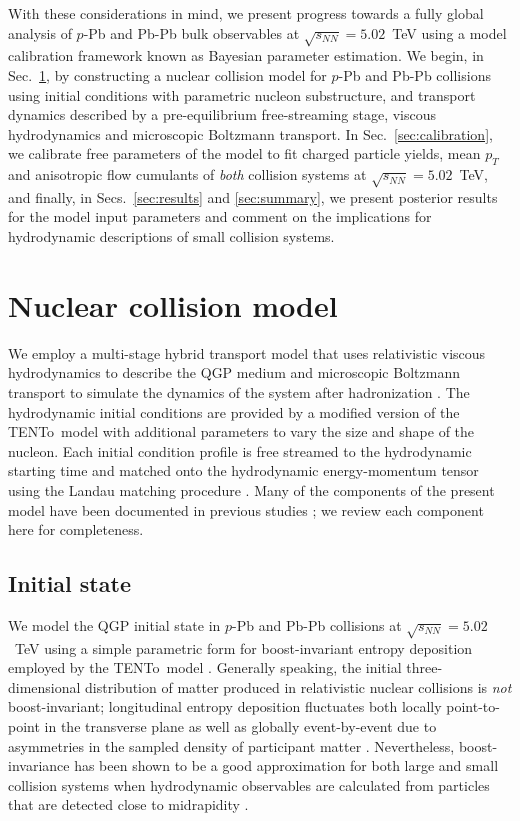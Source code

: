 \documentclass[aps,prc,reprint,amsmath,nofootinbib]{revtex4-1}
\newcommand{\trento}{T\raisebox{-0.5ex}{R}ENTo}
\newcommand{\sqrts}{\sqrt{s_{NN}}}
\begin{document}
With these considerations in mind, we present progress towards a fully global analysis of $p$-Pb and Pb-Pb bulk observables at $\sqrts=5.02$~TeV using a model calibration framework known as Bayesian parameter estimation.
We begin, in Sec.~\ref{sec:model}, by constructing a nuclear collision model for $p$-Pb and Pb-Pb collisions using initial conditions with parametric nucleon substructure, and transport dynamics described by a pre-equilibrium free-streaming stage, viscous hydrodynamics and microscopic Boltzmann transport.
In Sec.~\ref{sec:calibration}, we calibrate free parameters of the model to fit charged particle yields, mean $p_T$ and anisotropic flow cumulants of \emph{both} collision systems at $\sqrts=5.02$~TeV, and finally, in Secs.~\ref{sec:results} and \ref{sec:summary}, we present posterior results for the model input parameters and comment on the implications for hydrodynamic descriptions of small collision systems.


\section{Nuclear collision model}
\label{sec:model}

We employ a multi-stage hybrid transport model that uses relativistic viscous hydrodynamics to describe the QGP medium and microscopic Boltzmann transport to simulate the dynamics of the system after hadronization \cite{Shen:2014vra, Bernhard:2016tnd}.
The hydrodynamic initial conditions are provided by a modified version of the \trento\ model \cite{Moreland:2014oya} with additional parameters to vary the size and shape of the nucleon.
Each initial condition profile is free streamed to the hydrodynamic starting time and matched onto the hydrodynamic energy-momentum tensor using the Landau matching procedure \cite{Broniowski:2008qk, Heinz:2015arc}.
Many of the components of the present model have been documented in previous studies \cite{Moreland:2014oya, Bernhard:2016tnd, Bernhard:2018hnz}; we review each component here for completeness.

\subsection{Initial state}
\label{sec:initial_state}

We model the QGP initial state in $p$-Pb and Pb-Pb collisions at $\sqrts=5.02$~TeV using a simple parametric form for boost-invariant entropy deposition employed by the \trento\ model \cite{Moreland:2014oya}.
Generally speaking, the initial three-dimensional distribution of matter produced in relativistic nuclear collisions is \emph{not} boost-invariant; longitudinal entropy deposition fluctuates both locally point-to-point in the transverse plane as well as globally event-by-event due to asymmetries in the sampled density of participant matter \cite{Ke:2016jrd, Bozek:2010vz}.
Nevertheless, boost-invariance has been shown to be a good approximation for both large and small collision systems when hydrodynamic observables are calculated from particles that are detected close to midrapidity \cite{Shen:2016zpp}.
\end{document}
